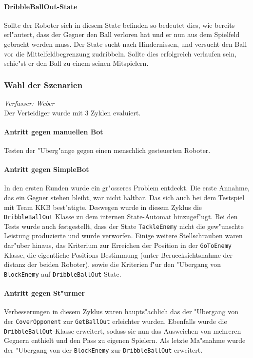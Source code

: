\paragraph{DribbleBallOut-State}
Sollte der Roboter sich in diesem State befinden so bedeutet dies, wie bereits erl"autert, dass der Gegner den Ball verloren hat und er nun aus dem Spielfeld gebracht werden muss. Der State sucht nach Hindernissen, und versucht den Ball vor die Mittelfeldbegrenzung zudribbeln. Sollte dies erfolgreich verlaufen sein, schie"st er den Ball zu einem seinen Mitspielern.

\subsubsection{Wahl der Szenarien}
\textit{Verfasser: Weber}\\

Der Verteidiger wurde mit 3 Zyklen evaluiert.

\paragraph{Antritt gegen manuellen Bot}
Testen der "Uberg"ange gegen einen menschlich gesteuerten Roboter.

\paragraph{Antritt gegen SimpleBot}
In den ersten Runden wurde ein gr"osseres Problem entdeckt. Die erste Annahme, das ein Gegner stehen bleibt, war nicht haltbar. Das sich auch bei dem Testspiel mit Team KKB best"atigte. Deswegen wurde in diesem Zyklus die \lstinline{DribbleBallOut} Klasse zu dem internen State-Automat hinzugef"ugt. Bei den Tests wurde auch festgestellt, dass der State \lstinline{TackleEnemy} nicht die gew"unschte Leistung produzierte und wurde verworfen. Einige weitere Stellschrauben waren dar"uber hinaus, das Kriterium zur Erreichen der Position in der \lstinline{GoToEnemy} Klasse, die eigentliche Positions Bestimmung (unter Beruecksichtsnahme der distanz der beiden Roboter), sowie die Kriterien f"ur den "Ubergang von \lstinline{BlockEnemy} auf \lstinline{DribbleBallOut} State.

\paragraph{Antritt gegen St"urmer}
Verbesserungen in diesem Zyklus waren haupts"achlich das der "Ubergang von der \lstinline{CoverOpponent} zur \lstinline{GetBallOut} erleichter wurden. Ebenfalls wurde die \lstinline{DribbleBallOut}-Klasse erweitert, sodass sie nun das Ausweichen von mehreren Gegnern enthielt und den Pass zu eigenen Spielern. Als letzte Ma"snahme wurde der "Ubergang von der \lstinline{BlockEnemy} zur \lstinline{DribbleBallOut} erweitert.



